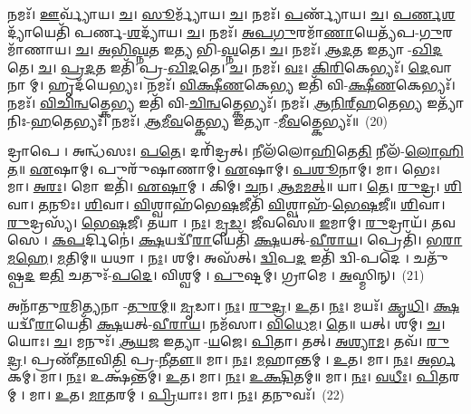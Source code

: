 𑌨𑌮𑌃᳴। \ul{𑌊}\-𑌰𑍍𑌵𑍍𑌯𑌾᳴𑌯। \ul{𑌚}\-। \ul{𑌸𑍂}\-𑌰𑍍𑌮𑍍𑌯𑌾᳴𑌯। \ul{𑌚}\-। 
𑌨𑌮𑌃᳴। \ul{𑌪}\-𑌰𑍍𑌣𑍍𑌯𑌾᳴𑌯। \ul{𑌚}\-। \ul{𑌪}\-\-\ul{𑌰𑍍𑌣}\-\-\ul{𑌶}\-𑌦𑍍𑌯𑌾᳴𑌯𑍇𑌤𑌿᳴ 𑌪𑌰𑍍𑌣-\-\ul{𑌶}\-𑌦𑍍𑌯𑌾᳴𑌯। \ul{𑌚}\-। 
𑌨𑌮𑌃᳴। \ul{𑌅}\-\-\ul{𑌪}\-\-\ul{𑌗𑍁}\-𑌰𑌮𑌾᳴\-\ul{𑌣𑌾}\-𑌯𑍇𑌤𑍍𑌯᳴𑌪-\-\ul{𑌗𑍁}\-𑌰𑌮𑌾᳴𑌣𑌾𑌯। \ul{𑌚}\-। \ul{𑌅}\-\-\ul{𑌭𑌿}\-\-\ul{𑌘𑍍𑌨}\-𑌤 𑌇𑌤𑍍𑌯𑌭𑌿-\-\ul{𑌘𑍍𑌨}\-𑌤𑍇। \ul{𑌚}\-। 
𑌨𑌮𑌃᳴। \mbox{\-\ul{𑌆}\-\akhkhi{}\-\ul{𑌦}\-𑌤} 𑌇𑌤𑍍𑌯𑌾-\-\ul{𑌖𑌿}\-\-\ul{𑌦}\-𑌤𑍇। \ul{𑌚}\-। \mbox{\-\ul{𑌪𑍍𑌰}\-\akhkhi{}\-\ul{𑌦}\-𑌤} 𑌇𑌤𑌿᳴ 𑌪𑍍𑌰-\-\ul{𑌖𑌿}\-\-\ul{𑌦}\-𑌤𑍇। \ul{𑌚}\-। 
𑌨𑌮𑌃᳴। \ul{𑌵𑌃}\-। \ul{𑌕𑌿}\-\-\ul{𑌰𑌿}\-𑌕𑍇𑌭𑍍𑌯𑌃᳴। \ul{𑌦𑍇}\-𑌵𑌾𑌨𑌾𑌮𑍍। 𑌹𑍃𑌦᳴𑌯𑍇𑌭𑍍𑌯𑌃। 𑌨𑌮𑌃᳴। 
\-\ul{𑌵𑌿}\-\-\ul{𑌕𑍍𑌷𑍀}\-\-\ul{𑌣}\-𑌕𑍇\-\ul{𑌭𑍍𑌯} 𑌇𑌤𑌿᳴ 𑌵𑌿-\-\ul{𑌕𑍍𑌷𑍀}\-\-\ul{𑌣}\-𑌕𑍇𑌭𑍍𑌯𑌃᳴। 𑌨𑌮𑌃᳴। \ul{𑌵𑌿}\-\-\ul{𑌚𑌿}\-\-\ul{𑌨𑍍𑌵}\-𑌤𑍍𑌕𑍇\-\ul{𑌭𑍍𑌯} 𑌇𑌤𑌿᳴ 𑌵𑌿-\-\ul{𑌚𑌿}\-\-\ul{𑌨𑍍𑌵}\-𑌤𑍍𑌕𑍇𑌭𑍍𑌯𑌃᳴। 𑌨𑌮𑌃᳴। 
\-\ul{𑌆}\-\-\ul{𑌨𑌿}\-\-\ul{𑌰𑍍}\-‌\-\ul{𑌹}\-𑌤𑍇\-\ul{𑌭𑍍𑌯} 𑌇𑌤𑍍𑌯𑌾᳴𑌨𑌿𑌃-\-\ul{𑌹}\-𑌤𑍇𑌭𑍍𑌯𑌃᳴। 𑌨𑌮𑌃᳴। \ul{𑌆}\-\-\ul{𑌮𑍀}\-\-\ul{𑌵}\-𑌤𑍍𑌕𑍇\-\ul{𑌭𑍍𑌯} 𑌇𑌤𑍍𑌯𑌾-\-\ul{𑌮𑍀}\-\-\ul{𑌵}\-𑌤𑍍𑌕𑍇𑌭𑍍𑌯𑌃᳴॥~(20)


𑌦𑍍𑌰𑌾𑌪𑍇। 𑌅𑌨𑍍𑌧᳴𑌸𑌃। \ul{𑌪}\-\-\ul{𑌤𑍇}\-। 𑌦𑌰𑌿᳴𑌦𑍍𑌰𑌤𑍍। 𑌨𑍀𑌲᳴𑌲𑍋\-\ul{𑌹𑌿}\-𑌤𑍇\-\ul{𑌤𑌿} 𑌨𑍀𑌲᳴-\-\ul{𑌲𑍋}\-\-\ul{𑌹𑌿}\-\-\ul{𑌤}\-॥ 
\-\ul{𑌏}\-𑌷𑌾𑌮𑍍। 𑌪𑍁𑌰𑍁᳴𑌷𑌾𑌣𑌾𑌮𑍍। \ul{𑌏}\-𑌷𑌾𑌮𑍍। \ul{𑌪}\-\-\ul{𑌶𑍂}\-𑌨𑌾𑌮𑍍। 𑌮𑌾। 𑌭𑍇𑌃। 𑌮𑌾। \ul{𑌅}\-\-\ul{𑌰𑌃}\-। 𑌮𑍋 𑌇𑌤𑌿᳴। \ul{𑌏}\-\-\ul{𑌷𑌾}\-𑌮𑍍। 𑌕𑌿𑌮𑍍। \ul{𑌚}\-𑌨। \ul{𑌆}\-\-\ul{𑌮}\-\-\ul{𑌮}\-\-\ul{𑌤𑍍}\-॥ 
𑌯𑌾। \ul{𑌤𑍇}\-। \ul{𑌰𑍁}\-\-\ul{𑌦𑍍𑌰}\-। \ul{𑌶𑌿}\-𑌵𑌾। \ul{𑌤}\-𑌨𑍂𑌃। \ul{𑌶𑌿}\-𑌵𑌾। \ul{𑌵𑌿}\-𑌶𑍍𑌵𑌾𑌹᳴𑌭𑍇\-\ul{𑌷}\-𑌜𑍀𑌤𑌿᳴ \ul{𑌵𑌿}\-𑌶𑍍𑌵𑌾𑌹᳴-\-\ul{𑌭𑍇}\-\-\ul{𑌷}\-\-\ul{𑌜𑍀}\-॥ 
\-\ul{𑌶𑌿}\-𑌵𑌾। \ul{𑌰𑍁}\-𑌦𑍍𑌰𑌸𑍍𑌯᳴। \ul{𑌭𑍇}\-\-\ul{𑌷}\-𑌜𑍀। 𑌤𑌯𑌾। \ul{𑌨𑌃}\-। \ul{𑌮𑍃}\-\-\ul{𑌡}\-। \ul{𑌜𑍀}\-𑌵𑌸𑍇॑॥ 
\-\ul{𑌇}\-𑌮𑌾𑌮𑍍। \ul{𑌰𑍁}\-𑌦𑍍𑌰𑌾𑌯᳴। \ul{𑌤}\-𑌵𑌸𑍇। \ul{𑌕}\-\-\ul{𑌪}\-𑌰𑍍𑌦𑌿𑌨𑍇॑। \ul{𑌕𑍍𑌷}\-𑌯𑌦𑍍𑌵𑍀᳴\-\ul{𑌰𑌾}\-𑌯𑍇𑌤𑌿᳴ \ul{𑌕𑍍𑌷}\-𑌯𑌤𑍍-\-\ul{𑌵𑍀}\-\-\ul{𑌰𑌾}\-\-\ul{𑌯}\-। 𑌪𑍍𑌰𑍇𑌤𑌿᳴। \ul{𑌭}\-\-\ul{𑌰𑌾}\-\-\ul{𑌮}\-\-\ul{𑌹𑍇}\-। \ul{𑌮}\-𑌤𑌿𑌮𑍍॥ 
𑌯𑌥𑌾। \ul{𑌨𑌃}\-। 𑌶𑌮𑍍। 𑌅𑌸᳴𑌤𑍍। \ul{𑌦𑍍𑌵𑌿}\-𑌪\-\ul{𑌦} 𑌇𑌤𑌿᳴ 𑌦𑍍𑌵𑌿-𑌪𑌦𑍇। 𑌚𑌤𑍁᳴𑌷𑍍𑌪\-\ul{𑌦} 𑌇\-\ul{𑌤𑌿} 𑌚𑌤𑍁𑌃᳴-\-\ul{𑌪}\-\-\ul{𑌦𑍇}\-। 𑌵𑌿𑌶𑍍𑌵𑌮𑍍। \ul{𑌪𑍁}\-𑌷𑍍𑌟𑌮𑍍। 𑌗𑍍𑌰𑌾𑌮𑍇। \ul{𑌅}\-𑌸𑍍𑌮𑌿𑌨𑍍।~(21)


𑌅𑌨𑌾᳴𑌤𑍁\-\ul{𑌰}\-𑌮𑌿𑌤𑍍𑌯𑌨𑌾-\-\ul{𑌤𑍁}\-\-\ul{𑌰}\-\-\ul{𑌮𑍍}\-॥ 
\-\ul{𑌮𑍃}\-𑌡𑌾। \ul{𑌨𑌃}\-। \ul{𑌰𑍁}\-\-\ul{𑌦𑍍𑌰}\-। \ul{𑌉}\-𑌤। \ul{𑌨𑌃}\-। 𑌮𑌯𑌃᳴। \ul{𑌕𑍃}\-\-\ul{𑌧𑌿}\-। \ul{𑌕𑍍𑌷}\-𑌯𑌦𑍍𑌵𑍀᳴\-\ul{𑌰𑌾}\-𑌯𑍇𑌤𑌿᳴ \ul{𑌕𑍍𑌷}\-𑌯𑌤𑍍-\-\ul{𑌵𑍀}\-\-\ul{𑌰𑌾}\-\-\ul{𑌯}\-। 𑌨𑌮᳴𑌸𑌾। \ul{𑌵𑌿}\-\-\ul{𑌧𑍇}\-\-\ul{𑌮}\-। \ul{𑌤𑍇}\-॥ 
𑌯𑌤𑍍। 𑌶𑌮𑍍। \ul{𑌚}\-। 𑌯𑍋𑌃। \ul{𑌚}\-। 𑌮𑌨𑍁𑌃᳴। \ul{𑌆}\-\-\ul{𑌯}\-𑌜 𑌇𑌤𑍍𑌯𑌾-\-\ul{𑌯}\-𑌜𑍇। \ul{𑌪𑌿}\-𑌤𑌾। 𑌤𑌤𑍍। \ul{𑌅}\-\-\ul{𑌶𑍍𑌯𑌾}\-\-\ul{𑌮}\-। 𑌤𑌵᳴। \ul{𑌰𑍁}\-\-\ul{𑌦𑍍𑌰}\-। 𑌪𑍍𑌰𑌣𑍀᳴\-\ul{𑌤𑌾}\-𑌵𑌿\-\ul{𑌤𑌿} 𑌪𑍍𑌰-\-\ul{𑌨𑍀}\-\-\ul{𑌤𑍗}\-॥ 
𑌮𑌾। \ul{𑌨𑌃}\-। \ul{𑌮}\-𑌹𑌾𑌨𑍍𑌤𑌮𑍍। \ul{𑌉}\-𑌤। 𑌮𑌾। \ul{𑌨𑌃}\-। \ul{𑌅}\-\-\ul{𑌰𑍍𑌭}\-𑌕𑌮𑍍। 𑌮𑌾। \ul{𑌨𑌃}\-। 𑌉𑌕𑍍𑌷᳴𑌨𑍍𑌤𑌮𑍍। \ul{𑌉}\-𑌤। 𑌮𑌾। \ul{𑌨𑌃}\-। \ul{𑌉}\-\-\ul{𑌕𑍍𑌷𑌿}\-𑌤𑌮𑍍॥ 
𑌮𑌾। \ul{𑌨𑌃}\-। \ul{𑌵}\-\-\ul{𑌧𑍀𑌃}\-। \ul{𑌪𑌿}\-𑌤𑌰𑌮𑍍। 𑌮𑌾। \ul{𑌉}\-𑌤। \ul{𑌮𑌾}\-𑌤𑌰𑌮𑍍। \ul{𑌪𑍍𑌰𑌿}\-𑌯𑌾𑌃। 𑌮𑌾। \ul{𑌨𑌃}\-। \ul{𑌤}\-𑌨𑍁𑌵𑌃᳴।~(22)


